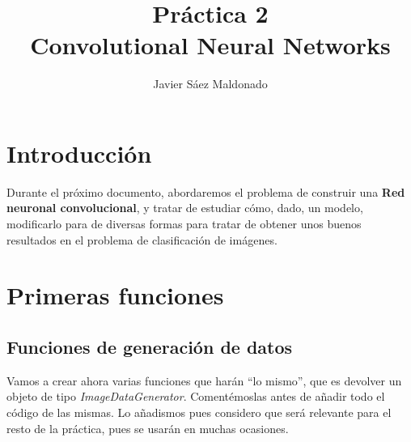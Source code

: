 \documentclass[11pt]{article}
\title{Práctica 2\\ Convolutional Neural Networks}
\author{Javier Sáez Maldonado}
\begin{document}
    \maketitle
    \newpage
    
    \tableofcontents
    
    \newpage
    
    \section*{Introducción}
    
    Durante el próximo documento, abordaremos el problema de construir una \textbf{Red neuronal convolucional}, y tratar de estudiar cómo, dado, un modelo, modificarlo para de diversas formas para tratar de obtener unos buenos resultados en el problema de clasificación de imágenes.
    
   	
    

    
    \hypertarget{primeras-funciones}{%
\section{Primeras
funciones}\label{primeras-funciones}}

   

    \hypertarget{funciones-de-generaciuxf3n-de-datos}{%
\subsection{Funciones de generación de
datos}\label{funciones-de-generaciuxf3n-de-datos}}

Vamos a crear ahora varias funciones que harán ``lo mismo'', que es
devolver un objeto de tipo \emph{ImageDataGenerator}. Comentémoslas antes de añadir todo el código de las mismas. Lo añadismos pues considero que será relevante para el resto de la práctica, pues se usarán en muchas ocasiones.
\end{document}

